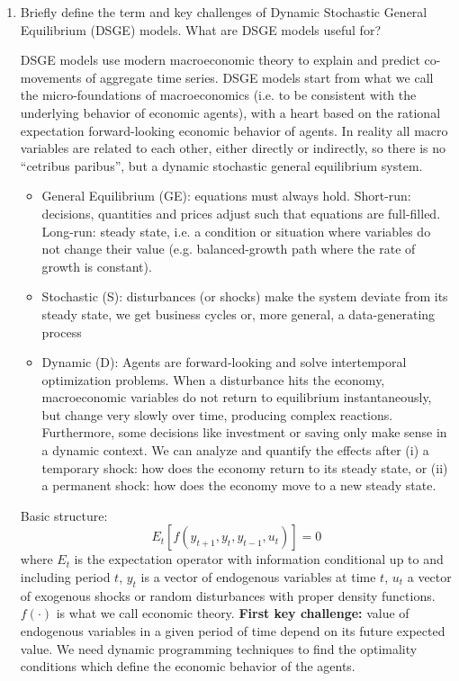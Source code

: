 \begin{enumerate}
    \item Briefly define the term and key challenges of Dynamic Stochastic General Equilibrium (DSGE) models. What are DSGE models useful for?
          \begin{solution}
              DSGE models use modern macroeconomic theory to explain and predict co-movements of aggregate time series. DSGE models start from what we call the micro-foundations of macroeconomics (i.e. to be consistent with the underlying behavior of economic agents), with a heart based on the rational expectation forward-looking economic behavior of agents. In reality all macro variables are related to each other, either directly or indirectly, so there is no \enquote{cetribus paribus}, but a dynamic stochastic general equilibrium system.
              \begin{itemize}
                  \item General Equilibrium (GE): equations must always hold. Short-run: decisions, quantities and prices adjust such that equations are full-filled. Long-run: steady state, i.e. a condition or situation where variables do not change their value (e.g. balanced-growth path where the rate of growth is constant).
                  \item Stochastic (S): disturbances (or shocks) make the system deviate from its steady state, we get business cycles or, more general, a data-generating process
                  \item Dynamic (D): Agents are forward-looking and solve intertemporal optimization problems. When a disturbance hits the economy, macroeconomic variables do not return to equilibrium instantaneously, but change very slowly over time, producing complex reactions. Furthermore, some decisions like investment or saving only make sense in a dynamic context. We can analyze and quantify the effects after (i) a temporary shock: how does the economy return to its steady state, or (ii) a permanent shock: how does the economy move to a new steady state.
              \end{itemize}
              Basic structure:
              $$ E_t \left[f(y_{t+1}, y_t, y_{t-1},u_t)\right]=0$$
              where $E_t$ is the expectation operator with information conditional up to and including period $t$, $y_t$ is a vector of endogenous variables at time $t$, $u_t$ a vector of exogenous shocks or random disturbances with proper density functions. $f(\cdot)$ is what we call economic theory. \textbf{First key challenge:} value of endogenous variables in a given period of time depend on its future expected value. We need dynamic programming techniques to find the optimality conditions which define the economic behavior of the agents.


\end{solution}
\end{enumerate}
